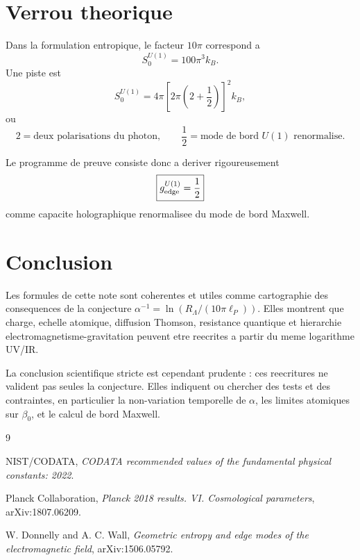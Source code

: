 \documentclass[11pt,a4paper]{article}
\begin{document}
\section{Verrou theorique}

Dans la formulation entropique, le facteur \(10\pi\) correspond a
\begin{equation}
S_0^{U(1)}=100\pi^3k_B.
\end{equation}
Une piste est
\begin{equation}
S_0^{U(1)}=4\pi\left[2\pi\left(2+\frac12\right)\right]^2 k_B,
\end{equation}
ou
\begin{equation}
2=\text{deux polarisations du photon},
\qquad
\frac12=\text{mode de bord }U(1)\text{ renormalise}.
\end{equation}

Le programme de preuve consiste donc a deriver rigoureusement
\begin{equation}
\boxed{
g_{\rm edge}^{U(1)}=\frac12
}
\end{equation}
comme capacite holographique renormalisee du mode de bord Maxwell.

\section{Conclusion}

Les formules de cette note sont coherentes et utiles comme cartographie des
consequences de la conjecture \(\alpha^{-1}=\ln(R_\Lambda/(10\pi\ell_P))\).
Elles montrent que charge, echelle atomique, diffusion Thomson, resistance
quantique et hierarchie electromagnetisme-gravitation peuvent etre reecrites a
partir du meme logarithme UV/IR.

La conclusion scientifique stricte est cependant prudente : ces reecritures ne
valident pas seules la conjecture. Elles indiquent ou chercher des tests et des
contraintes, en particulier la non-variation temporelle de \(\alpha\), les
limites atomiques sur \(\beta_0\), et le calcul de bord Maxwell.

\begin{thebibliography}{9}

NIST/CODATA, \emph{CODATA recommended values of the fundamental physical
constants: 2022}.

Planck Collaboration, \emph{Planck 2018 results. VI. Cosmological parameters},
arXiv:1807.06209.

W. Donnelly and A. C. Wall, \emph{Geometric entropy and edge modes of the
electromagnetic field}, arXiv:1506.05792.

\end{thebibliography}
\end{document}
